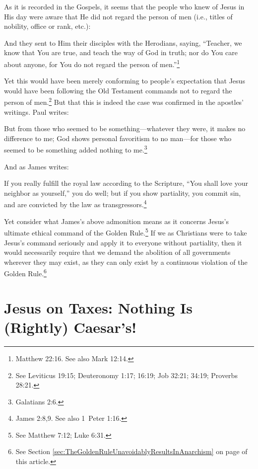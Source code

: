 \documentclass[letterpaper,12pt]{article}
\newenvironment{squote}
  {\small\quote}
  {\endquote\normalsize}
\begin{document}
As it is recorded in the Gospels, it seems that the people who knew of Jesus in His day were aware that He did not regard the person of men (i.e., titles of nobility, office or rank, etc.):

\begin{squote}
And they sent to Him their disciples with the Herodians, saying, ``Teacher, we know that You are true, and teach the way of God in truth; nor do You care about anyone, for You do not regard the person of men.''\footnote{Matthew 22:16. See also Mark 12:14.}
\end{squote}

Yet this would have been merely conforming to people's expectation that Jesus would have been following the Old Testament commands not to regard the person of men.\footnote{See Leviticus 19:15; Deuteronomy 1:17; 16:19; Job 32:21; 34:19; Proverbs 28:21.} But that this is indeed the case was confirmed in the apostles' writings. Paul writes:

\begin{squote}
But from those who seemed to be something---whatever they were, it makes no difference to me; God shows personal favoritism to no man---for those who seemed to be something added nothing to me.\footnote{Galatians 2:6.}
\end{squote}

And as James writes:

\begin{squote}
If you really fulfill the royal law according to the Scripture, ``You shall love your neighbor as yourself,'' you do well; but if you show partiality, you commit sin, and are convicted by the law as transgressors.\footnote{James 2:8,9. See also 1~Peter 1:16.}
\end{squote}

Yet consider what James's above admonition means as it concerns Jesus's ultimate ethical command of the Golden Rule.\footnote{See Matthew 7:12; Luke 6:31.} If we as Christians were to take Jesus's command seriously and apply it to everyone without partiality, then it would necessarily require that we demand the abolition of all governments wherever they may exist, as they can only exist by a continuous violation of the Golden Rule.\footnote{See Section \ref{sec:TheGoldenRuleUnavoidablyResultsInAnarchism} on page \pageref{sec:TheGoldenRuleUnavoidablyResultsInAnarchism} of this article.}

\section{Jesus on Taxes: Nothing Is (Rightly) Caesar's!}
\label{sec:JesusOnTaxesNothingIsRightlyCaesarS}
\end{document}
